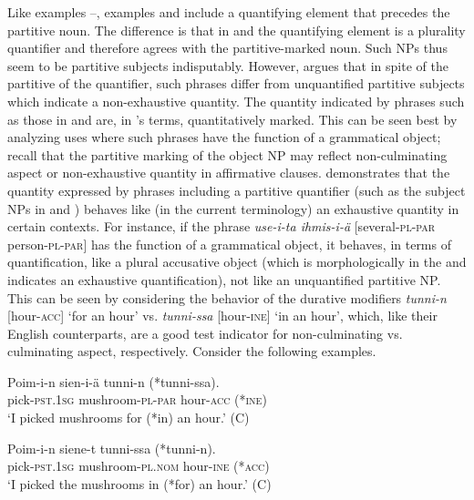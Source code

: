 \documentclass[output=paper]{LSP/langsci}
\begin{document}
Like examples --, examples  and  include a quantifying element that precedes the partitive noun. The difference is that in  and  the quantifying element is a plurality quantifier and therefore agrees with the partitive-marked noun. Such NPs thus seem to be partitive subjects indisputably. However, \citet{Yli-Vakkuri1979Partitiivisubjektin} argues that in spite of the partitive of the quantifier, such phrases differ from unquantified partitive subjects which indicate a non-exhaustive quantity. The quantity indicated by phrases such as those in  and  are, in \citeauthor{Yli-Vakkuri1979Partitiivisubjektin}’s terms, quantitatively marked. This can be seen best by analyzing uses where such phrases have the function of a grammatical object; recall that the partitive marking of the object NP may reflect non-culminating aspect or non-exhaustive quantity in affirmative clauses. \citet{Yli-Vakkuri1979Partitiivisubjektin} demonstrates that the quantity expressed by phrases including a partitive quantifier (such as the subject NPs in  and ) behaves like (in the current terminology) an exhaustive quantity in certain contexts. For instance, if the phrase \textit{use-i-ta ihmis-i-ä} [several-\textsc{pl}-\textsc{par} person-\textsc{pl}-\textsc{par}] has the function of a grammatical object, it behaves, in terms of quantification, like a plural accusative object (which is morphologically in the  and indicates an exhaustive quantification), not like an unquantified partitive NP. This can be seen by considering the behavior of the durative modifiers \textit{tunni-n} [hour-\textsc{acc}] ‘for an hour’ vs. \textit{tunni-ssa} [hour-\textsc{ine}] ‘in an hour’, which, like their English counterparts, are a good test indicator for non-culminating vs. culminating aspect, respectively. Consider the following examples. 

\ea\label{15-hu-ex:41}
\gll Poim-i-n sien-i-ä tunni-n (*tunni-ssa).\\
pick-\textsc{pst}.\textsc{1sg} mushroom-\textsc{pl}-\textsc{par} hour-\textsc{acc} (*\textsc{ine})\\
\glt ‘I picked mushrooms for (*in) an hour.’  (C)
\z

\ea\label{15-hu-ex:42}
\gll Poim-i-n siene-t tunni-ssa (*tunni-n).\\
pick-\textsc{pst}.\textsc{1sg} mushroom-\textsc{pl}.\textsc{nom} hour-\textsc{ine} (*\textsc{acc})\\
\glt ‘I picked the mushrooms in (*for) an hour.’   (C)
\z
\end{document}
